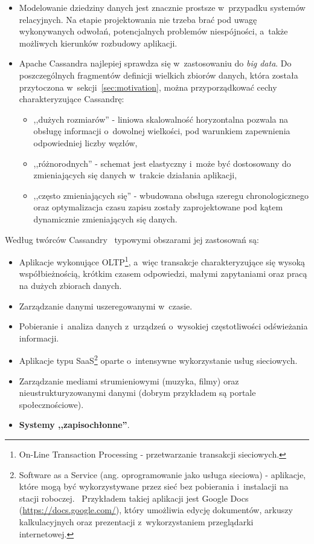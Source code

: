 \begin{itemize}
	\item Modelowanie dziedziny danych jest znacznie prostsze w~przypadku systemów relacyjnych. Na etapie projektowania nie trzeba brać pod uwagę wykonywanych odwołań, potencjalnych problemów niespójności, a~także możliwych kierunków rozbudowy aplikacji.
	\item Apache Cassandra najlepiej sprawdza się w~zastosowaniu do \emph{big data}. Do poszczególnych fragmentów definicji wielkich zbiorów danych, która została przytoczona w~sekcji~\ref{sec:motivation}, można przyporządkować cechy charakteryzujące Cassandrę:
		\begin{itemize}
			\item ,,dużych rozmiarów'' - liniowa skalowalność horyzontalna pozwala na obsługę informacji o~dowolnej wielkości, pod warunkiem zapewnienia odpowiedniej liczby węzłów,
			\item ,,różnorodnych'' - schemat jest elastyczny i~może być dostosowany do zmieniających się danych w~trakcie działania aplikacji,
			\item ,,często zmieniających się'' - wbudowana obsługa szeregu chronologicznego oraz optymalizacja czasu zapisu zostały zaprojektowane pod kątem dynamicznie zmieniających się danych. 
		\end{itemize}
\end{itemize}

\noindent Według twórców Cassandry~\cite{why_migrate_from_mysql} typowymi obszarami jej zastosowań są:

\begin{itemize}
	\item Aplikacje wykonujące OLTP\footnote{On-Line Transaction Processing - przetwarzanie transakcji sieciowych.}, a~więc transakcje charakteryzujące się wysoką współbieżnością, krótkim czasem odpowiedzi, małymi zapytaniami oraz pracą na dużych zbiorach danych.~\cite{oltp_definition}
	\item Zarządzanie danymi uszeregowanymi w~czasie.
	\item Pobieranie i~analiza danych z~urządzeń o~wysokiej częstotliwości odświeżania informacji.
	\item Aplikacje typu SaaS\footnote{Software as a Service (ang. oprogramowanie jako usługa sieciowa) - aplikacje, które mogą być wykorzystywane przez sieć bez pobierania i~instalacji na stacji roboczej.~\cite{saas_definition} Przykładem takiej aplikacji jest Google Docs (\url{https://docs.google.com/}), który umożliwia edycję dokumentów, arkuszy kalkulacyjnych oraz prezentacji z~wykorzystaniem przeglądarki internetowej.} oparte o~intensywne wykorzystanie usług sieciowych.
	\item Zarządzanie mediami strumieniowymi (muzyka, filmy) oraz nieustrukturyzowanymi danymi (dobrym przykładem są portale społecznościowe).
	\item \textbf{Systemy ,,zapisochłonne''}.
\end{itemize}

